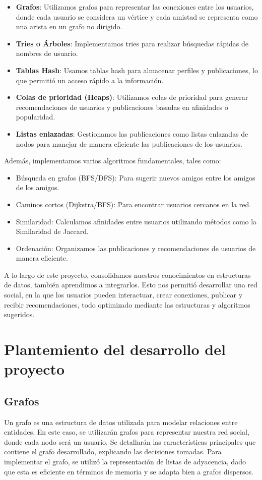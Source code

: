 \documentclass[9pt,letterpaper,onecolumn]{rho-class/rho}
\begin{document}
\begin{itemize}
    \item \textbf{Grafos}: Utilizamos grafos para representar las conexiones entre los usuarios, donde cada usuario se considera un vértice y cada amistad se representa como una arista en un grafo no dirigido.
    \item \textbf{Tries o Árboles}: Implementamos tries para realizar búsquedas rápidas de nombres de usuario.
    \item \textbf{Tablas Hash}: Usamos tablas hash para almacenar perfiles y publicaciones, lo que permitió un acceso rápido a la información.
    \item \textbf{Colas de prioridad (Heaps)}: Utilizamos colas de prioridad para generar recomendaciones de usuarios y publicaciones basadas en afinidades o popularidad.
    \item \textbf{Listas enlazadas}: Gestionamos las publicaciones como listas enlazadas de nodos para manejar de manera eficiente las publicaciones de los usuarios.
\end{itemize}

Además, implementamos varios algoritmos fundamentales, tales como:

\begin{itemize}
    \item Búsqueda en grafos (BFS/DFS): Para sugerir nuevos amigos entre los amigos de los amigos.
    \item Caminos cortos (Dijkstra/BFS): Para encontrar usuarios cercanos en la red.
    \item Similaridad: Calculamos afinidades entre usuarios utilizando métodos como la Similaridad de Jaccard.
    \item Ordenación: Organizamos las publicaciones y recomendaciones de usuarios de manera eficiente.
\end{itemize}

A lo largo de este proyecto, consolidamos nuestros conocimientos en estructuras de datos, también aprendimos a integrarlos. Esto nos permitió desarrollar una red social, en la que los usuarios pueden interactuar, crear conexiones, publicar y recibir recomendaciones, todo optimizado mediante las estructuras y algoritmos sugeridos.


\section{Plantemiento del desarrollo del proyecto}

    \subsection{Grafos}
    Un grafo es una estructura de datos utilizada para modelar relaciones entre entidades.
    En este caso, se utilizarán grafos para representar nuestra red social, donde cada nodo será un usuario.
    Se detallarán las características principales que contiene el grafo desarrollado, explicando las decisiones tomadas. 
    Para implementar el grafo, se utilizó la representación de listas de adyacencia, dado que esta es eficiente en términos de memoria y se adapta bien a grafos dispersos.
\end{document}
